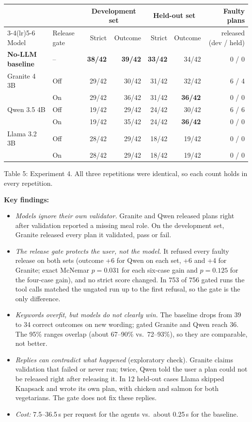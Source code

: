 \documentclass[11pt]{article}
\begin{document}
\begin{center}
\small
\begin{tabular}{@{}llrrrrr@{}}
\toprule
 & & \multicolumn{2}{c}{Development set} & \multicolumn{2}{c}{Held-out set} & Faulty plans \\
\cmidrule(lr){3-4}\cmidrule(lr){5-6}
Model & Release gate & Strict & Outcome & Strict & Outcome & released (dev / held) \\
\midrule
\textbf{No-LLM baseline} & -- & \textbf{38/42} & \textbf{39/42} & \textbf{33/42} & 34/42 & 0 / 0 \\
\midrule
Granite 4 3B & Off & 29/42 & 30/42 & 31/42 & 32/42 & 6 / 4 \\
 & On & 29/42 & 36/42 & 31/42 & \textbf{36/42} & 0 / 0 \\
Qwen 3.5 4B & Off & 19/42 & 29/42 & 24/42 & 30/42 & 6 / 6 \\
 & On & 19/42 & 35/42 & 24/42 & \textbf{36/42} & 0 / 0 \\
Llama 3.2 3B & Off & 28/42 & 29/42 & 18/42 & 19/42 & 0 / 0 \\
 & On & 28/42 & 29/42 & 18/42 & 19/42 & 0 / 0 \\
\bottomrule
\end{tabular}

Table 5: Experiment 4. All three repetitions were identical, so each count holds
in every repetition.
\end{center}

\textbf{Key findings:}
\begin{itemize}
  \item \emph{Models ignore their own validator.} Granite and Qwen released plans
        right after validation reported a missing meal role. On the development
        set, Granite released every plan it validated, pass or fail.
  \item \emph{The release gate protects the user, not the model.} It refused
        every faulty release on both sets (outcome +6 for Qwen on each set, +6
        and +4 for Granite; exact McNemar $p=0.031$ for each six-case gain and
        $p=0.125$ for the four-case gain), and no strict score changed. In 753
        of 756 gated runs the tool calls matched the ungated run up to the
        first refusal, so the gate is the only difference.
  \item \emph{Keywords overfit, but models do not clearly win.} The baseline drops
        from 39 to 34 correct outcomes on new wording; gated Granite and Qwen
        reach 36. The 95\% ranges overlap (about 67--90\% vs.\ 72--93\%), so they
        are comparable, not better.
  \item \emph{Replies can contradict what happened} (exploratory check). Granite
        claims validation that failed or never ran; twice, Qwen told the user a
        plan could not be released right after releasing it. In 12 held-out cases
        Llama skipped Knapsack and wrote its own plan, with chicken and salmon
        for both vegetarians. The gate does not fix these replies.
  \item \emph{Cost:} 7.5--36.5\,s per request for the agents vs.\ about 0.25\,s
        for the baseline.
\end{itemize}
\end{document}
